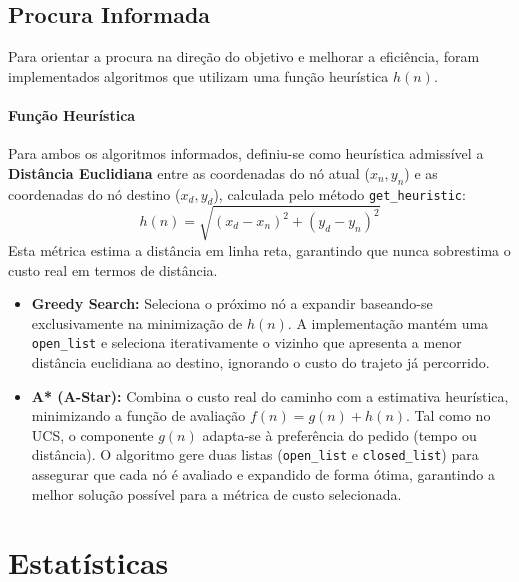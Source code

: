 \documentclass[11pt, a4paper, fleqn]{article}
\begin{document}
	\subsection{Procura Informada}
	
	Para orientar a procura na direção do objetivo e melhorar a eficiência, foram implementados algoritmos que utilizam uma função heurística $h(n)$.
	
	\paragraph{Função Heurística}
	Para ambos os algoritmos informados, definiu-se como heurística admissível a \textbf{Distância Euclidiana} entre as coordenadas do nó atual ($x_n, y_n$) e as coordenadas do nó destino ($x_d, y_d$), calculada pelo método \texttt{get\_heuristic}:
	\[ h(n) = \sqrt{(x_d - x_n)^2 + (y_d - y_n)^2} \]
	Esta métrica estima a distância em linha reta, garantindo que nunca sobrestima o custo real em termos de distância.
	
	\begin{itemize}
		\item \textbf{Greedy Search:}
		Seleciona o próximo nó a expandir baseando-se exclusivamente na minimização de $h(n)$. A implementação mantém uma \texttt{open\_list} e seleciona iterativamente o vizinho que apresenta a menor distância euclidiana ao destino, ignorando o custo do trajeto já percorrido.
		
		\item \textbf{A* (A-Star):}
		Combina o custo real do caminho com a estimativa heurística, minimizando a função de avaliação $f(n) = g(n) + h(n)$.
		Tal como no UCS, o componente $g(n)$ adapta-se à preferência do pedido (tempo ou distância). O algoritmo gere duas listas (\texttt{open\_list} e \texttt{closed\_list}) para assegurar que cada nó é avaliado e expandido de forma ótima, garantindo a melhor solução possível para a métrica de custo selecionada.
	\end{itemize}
	
	
	\section{Estatísticas}
	
\end{document}
